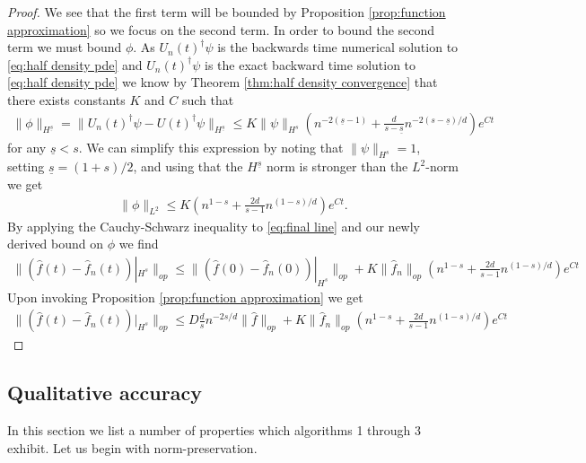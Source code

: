 \documentclass[12pt]{amsart}
\begin{document}
\begin{proof}
	We see that the first term will be bounded by Proposition \ref{prop:function approximation} so we focus on the second term.
	In order to bound the second term we must bound $\phi$.
	As $U_{n}(t)^{\dagger} \psi$ is the backwards time numerical solution to \eqref{eq:half density pde}
	and $U_{n}(t)^{\dagger}\psi$ is the exact backward time solution to \eqref{eq:half density pde} we know by Theorem \ref{thm:half density convergence} that
	there exists constants $K$ and $C$ such that
	\begin{align*}
		\| \phi \|_{H^{\underline{s}}} = \| U_{n}(t)^{\dagger} \psi - U(t)^{\dagger} \psi \|_{H^{\underline{s}}}  \leq K \| \psi \|_{H^{s}} \left(  n^{-2(\underline{s}-1)} + \frac{d}{s - \underline{s}} n^{-2(s-\underline{s})/d} \right) e^{Ct} 
	\end{align*}
	for any $\underline{s} <s$.
	We can simplify this expression by noting that $\| \psi \|_{H^{s}} = 1$, setting $\underline{s} = (1+s)/2$, and using that the $H^{\underline{s}}$ norm is stronger than the $L^{2}$-norm we get
	\begin{align*}
		 \| \phi \|_{L^{2}}  \leq  K \left(  n^{1-s} + \frac{2d}{s -1} n^{(1-s)/d} \right) e^{Ct}.
	\end{align*}
	By applying the Cauchy-Schwarz inequality to \eqref{eq:final line} and our newly derived bound on $\phi$ we find
	\begin{align*}
		\| ( \hat{f}(t) - \hat{f}_{n}(t))|_{H^{s}} \|_{op} \leq \| ( \hat{f}(0) - \hat{f}_{n}(0) )|_{H^{s}} \|_{op} +  K \| \hat{f}_{n} \|_{op} \left( n^{1-s} + \frac{2d}{s -1} n^{(1-s)/d} \right) e^{Ct}
	\end{align*}
	Upon invoking Proposition \ref{prop:function approximation} we get
	\begin{align*}
		\| ( \hat{f}(t) - \hat{f}_{n}(t))|_{H^{s}} \|_{op} \leq D \frac{d}{s} n^{-2s/d} \| \hat{f} \|_{op}+  K \| \hat{f}_{n} \|_{op} \left( n^{1-s} + \frac{2d}{s -1} n^{(1-s)/d} \right) e^{Ct}
	\end{align*}
\end{proof}


\subsection{Qualitative accuracy}
In this section we list a number of properties which algorithms 1 through 3 exhibit.  Let us begin with norm-preservation.
\end{document}
